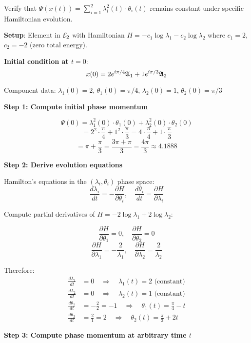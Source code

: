 \begin{example}
Verify that $\Psi(x(t)) = \sum_{i=1}^{2} \lambda_i^2(t) \cdot \theta_i(t)$ remains constant under specific Hamiltonian evolution.

\textbf{Setup}: Element in $\mathcal{E}_{2}$ with Hamiltonian $H = -c_1 \log \lambda_1 - c_2 \log \lambda_2$ where $c_1 = 2$, $c_2 = -2$ (zero total energy).

\textbf{Initial condition at $t=0$}:
$$x(0) = 2e^{i\pi/4}\mathfrak{A}_{1} + 1e^{i\pi/3}\mathfrak{A}_{2}$$

Component data: $\lambda_1(0) = 2$, $\theta_1(0) = \pi/4$, $\lambda_2(0) = 1$, $\theta_2(0) = \pi/3$

\textbf{Step 1: Compute initial phase momentum}

$$\Psi(0) = \lambda_1^2(0) \cdot \theta_1(0) + \lambda_2^2(0) \cdot \theta_2(0)$$
$$= 2^2 \cdot \frac{\pi}{4} + 1^2 \cdot \frac{\pi}{3} = 4 \cdot \frac{\pi}{4} + 1 \cdot \frac{\pi}{3}$$
$$= \pi + \frac{\pi}{3} = \frac{3\pi + \pi}{3} = \frac{4\pi}{3} \approx 4.1888$$

\textbf{Step 2: Derive evolution equations}

Hamilton's equations in the $(\lambda_i, \theta_i)$ phase space:
$$\frac{d\lambda_i}{dt} = -\frac{\partial H}{\partial \theta_i}, \quad \frac{d\theta_i}{dt} = \frac{\partial H}{\partial \lambda_i}$$

Compute partial derivatives of $H = -2\log\lambda_1 + 2\log\lambda_2$:

$$\frac{\partial H}{\partial \theta_1} = 0, \quad \frac{\partial H}{\partial \theta_2} = 0$$
$$\frac{\partial H}{\partial \lambda_1} = -\frac{2}{\lambda_1}, \quad \frac{\partial H}{\partial \lambda_2} = \frac{2}{\lambda_2}$$

Therefore:
\begin{align}
\frac{d\lambda_1}{dt} &= 0 \quad \Rightarrow \quad \lambda_1(t) = 2 \text{ (constant)} \\
\frac{d\lambda_2}{dt} &= 0 \quad \Rightarrow \quad \lambda_2(t) = 1 \text{ (constant)} \\
\frac{d\theta_1}{dt} &= -\frac{2}{2} = -1 \quad \Rightarrow \quad \theta_1(t) = \frac{\pi}{4} - t \\
\frac{d\theta_2}{dt} &= \frac{2}{1} = 2 \quad \Rightarrow \quad \theta_2(t) = \frac{\pi}{3} + 2t
\end{align}

\textbf{Step 3: Compute phase momentum at arbitrary time $t$}


\end{example}
